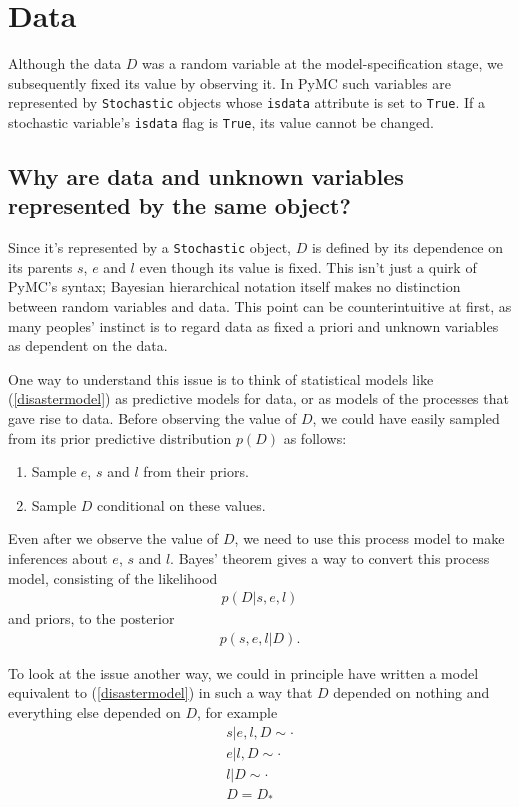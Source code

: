 \section{Data}

Although the data $D$ was a random variable at the model-specification stage, we subsequently fixed its value by observing it. In PyMC such variables are represented by \texttt{Stochastic} objects whose \texttt{isdata} attribute is set to \texttt{True}. If a stochastic variable's \texttt{isdata} flag is \texttt{True}, its value cannot be changed.

\subsection{Why are data and unknown variables represented by the same object?}
Since it's represented by a \texttt{Stochastic} object, $D$ is defined by its dependence on its parents $s$, $e$ and $l$ even though its value is fixed. This isn't just a quirk of PyMC's syntax; Bayesian hierarchical notation itself makes no distinction between random variables and data. This point can be counterintuitive at first, as many peoples' instinct is to regard data as fixed a priori and unknown variables as dependent on the data.

One way to understand this issue is to think of statistical models like (\ref{disastermodel}) as predictive models for data, or as models of the processes that gave rise to data. Before observing the value of $D$, we could have easily sampled from its prior predictive distribution $p(D)$ as follows:
\begin{enumerate}
    \item Sample $e$, $s$ and $l$ from their priors.
    \item Sample $D$ conditional on these values.
\end{enumerate}
Even after we observe the value of $D$, we need to use this process model to make inferences about $e$, $s$ and $l$. Bayes' theorem gives a way to convert this process model, consisting of the likelihood
\begin{eqnarray*}
    p(D|s,e,l)
\end{eqnarray*}
and priors, to the posterior
\begin{eqnarray*}
    p(s,e,l|D).
\end{eqnarray*}

\medskip
To look at the issue another way, we could in principle have written a model equivalent to (\ref{disastermodel}) in such a way that $D$ depended on nothing and everything else depended on $D$, for example
\begin{eqnarray*}
    s|e,l,D\sim\cdot\\
    e|l,D\sim\cdot\\
    l|D\sim\cdot\\
    D=D_*
\end{eqnarray*}

